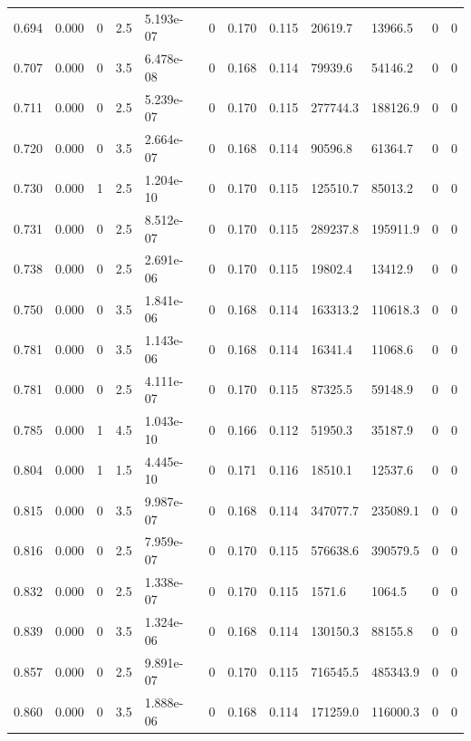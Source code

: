\documentclass[preview]{standalone}
\begin{document}
{{{\begin{tabular}{L{1.2cm}C{1.2cm} C{0.3cm}C{0.5cm} C{1.4cm}C{1.4cm} C{1.4cm}C{1.4cm} C{1.6cm}C{1.6cm} C{1.6cm}C{1.6cm}}
  0.694  &  0.000  & 0     & 2.5 &  5.193e-07  & 0  &  0.170&   0.115& 20619.7 & 13966.5   &  0 & 0  \\ 
  0.707  &  0.000  & 0     & 3.5 &  6.478e-08  & 0  &  0.168&   0.114& 79939.6 & 54146.2   &  0 & 0  \\ 
  0.711  &  0.000  & 0     & 2.5 &  5.239e-07  & 0  &  0.170&   0.115& 277744.3 & 188126.9   &  0 & 0  \\ 
  0.720  &  0.000  & 0     & 3.5 &  2.664e-07  & 0  &  0.168&   0.114& 90596.8 & 61364.7   &  0 & 0  \\ 
  0.730  &  0.000  & 1     & 2.5 &  1.204e-10  & 0  &  0.170&   0.115& 125510.7 & 85013.2   &  0 & 0  \\ 
  0.731  &  0.000  & 0     & 2.5 &  8.512e-07  & 0  &  0.170&   0.115& 289237.8 & 195911.9   &  0 & 0  \\ 
  0.738  &  0.000  & 0     & 2.5 &  2.691e-06  & 0  &  0.170&   0.115& 19802.4 & 13412.9   &  0 & 0  \\ 
  0.750  &  0.000  & 0     & 3.5 &  1.841e-06  & 0  &  0.168&   0.114& 163313.2 & 110618.3   &  0 & 0  \\ 
  0.781  &  0.000  & 0     & 3.5 &  1.143e-06  & 0  &  0.168&   0.114& 16341.4 & 11068.6   &  0 & 0  \\ 
  0.781  &  0.000  & 0     & 2.5 &  4.111e-07  & 0  &  0.170&   0.115& 87325.5 & 59148.9   &  0 & 0  \\ 
  0.785  &  0.000  & 1     & 4.5 &  1.043e-10  & 0  &  0.166&   0.112& 51950.3 & 35187.9   &  0 & 0  \\ 
  0.804  &  0.000  & 1     & 1.5 &  4.445e-10  & 0  &  0.171&   0.116& 18510.1 & 12537.6   &  0 & 0  \\ 
  0.815  &  0.000  & 0     & 3.5 &  9.987e-07  & 0  &  0.168&   0.114& 347077.7 & 235089.1   &  0 & 0  \\ 
  0.816  &  0.000  & 0     & 2.5 &  7.959e-07  & 0  &  0.170&   0.115& 576638.6 & 390579.5   &  0 & 0  \\ 
  0.832  &  0.000  & 0     & 2.5 &  1.338e-07  & 0  &  0.170&   0.115& 1571.6 & 1064.5   &  0 & 0  \\ 
  0.839  &  0.000  & 0     & 3.5 &  1.324e-06  & 0  &  0.168&   0.114& 130150.3 & 88155.8   &  0 & 0  \\ 
  0.857  &  0.000  & 0     & 2.5 &  9.891e-07  & 0  &  0.170&   0.115& 716545.5 & 485343.9   &  0 & 0  \\ 
  0.860  &  0.000  & 0     & 3.5 &  1.888e-06  & 0  &  0.168&   0.114& 171259.0 & 116000.3   &  0 & 0  \\ 

\end{tabular}}}}
\end{document}
